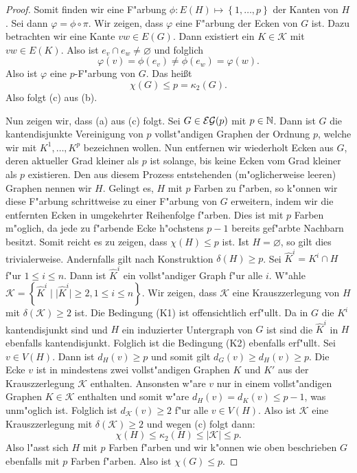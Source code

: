 \begin{proof}
  Somit finden wir eine F"arbung $\phi : E(H) \mapsto \left\{ 1,\dots,p \right\}$ der Kanten von $H$. Sei dann $\varphi =  \phi \circ \pi$. Wir zeigen, dass $\varphi$ eine F"arbung der Ecken von $G$ ist. Dazu betrachten wir eine Kante $vw\in E(G)$. Dann existiert ein $K\in \mathcal{K}$ mit $vw\in E(K)$. Also ist $e_v\cap e_w \neq \varnothing$ und folglich \begin{equation*}
    \varphi(v) = \phi(e_v) \neq \phi(e_w) = \varphi(w).
  \end{equation*} 
  Also ist $\varphi$ eine $p$-F"arbung von $G$. Das hei{\ss}t
  \begin{equation*}
    \chi(G) \leq p = \kappa_{2}(G).
  \end{equation*}
  Also folgt (c) aus (b).

  Nun zeigen wir, dass (a) aus (c) folgt. 
  Sei $G\in {\cal EG}(p) $ mit $p\in {\mathbb{N}}$. Dann ist $G$ die kantendisjunkte Vereinigung von $p$ vollst"andigen Graphen der Ordnung $p$, welche wir mit $K^{1},\dots, K^{p}$ bezeichnen wollen. Nun entfernen wir wiederholt Ecken aus $G$,  deren aktueller Grad kleiner als $p$ ist solange, bis keine Ecken vom Grad kleiner als $p$ existieren. Den aus diesem Prozess entstehenden (m"oglicherweise leeren) Graphen nennen wir $H$. 
  Gelingt es, $H$ mit $p$ Farben zu f"arben, so k"onnen wir diese F"arbung schrittweise zu einer F"arbung von $G$ erweitern, indem wir die entfernten Ecken in umgekehrter Reihenfolge f"arben. Dies ist mit $p$ Farben m"oglich, da jede zu f"arbende Ecke h"ochstens $p-1$ bereits gef"arbte Nachbarn besitzt.
  Somit reicht es zu zeigen, dass $\chi(H) \leq p$ ist. Ist $H =\varnothing$, so gilt dies trivialerweise. Andernfalls gilt nach Konstruktion $\delta(H) \geq p $. 
  Sei $\hat{K}^i = K^{i} \cap H$ f"ur $1\leq i \leq n$. Dann ist $\hat{K}^i$ ein vollst"andiger Graph f"ur alle $i$. W"ahle $\mathcal{K} = \left\{ \hat{K}^i \;|\; | \hat{K}^i| \geq 2  , 1\leq i \leq n\right\}$. Wir zeigen, dass $\mathcal{K}$ eine Krauszzerlegung von $H$ mit $\delta(\mathcal{K}) \geq 2$ ist.
  Die Bedingung (K1) ist offensichtlich erf"ullt. Da in $G$ die $K^{i}$ kantendisjunkt sind und $H$ ein induzierter Untergraph von $G$ ist sind die $\hat{K}^{i}$ in $H$ ebenfalls kantendisjunkt. Folglich ist die Bedingung (K2) ebenfalls erf"ullt. Sei $v\in V(H)$. Dann ist $d_{H}(v) \geq p$ und somit gilt $d_{G}(v) \geq d_H(v) \geq p$. 
  Die Ecke $v$ ist in mindestens zwei vollst"andigen Graphen $K$ und $K'$ aus der Krauszzerlegung $\mathcal{K}$ enthalten. 
  Ansonsten w"are $v$ nur in einem vollst"andigen Graphen $K \in \mathcal{K}$ enthalten und somit w"are $d_{H}(v) = d_{K}(v) \leq p-1$, was unm"oglich ist. 
  Folglich ist $d_{\mathcal{K}}(v) \geq 2$ f"ur alle $v \in V(H)$. Also ist $\mathcal{K}$ eine Krauszzerlegung mit $\delta(\mathcal{K}) \geq 2$ und wegen (c) folgt dann:
  \begin{equation*}
    \chi(H) \leq \kappa_{2}(H) \leq |\mathcal{K}| \leq p .
  \end{equation*}
  Also l"asst sich $H$ mit $p$ Farben f"arben und wir k"onnen wie oben beschrieben $G$ ebenfalls mit $p$ Farben f"arben. Also ist $\chi(G) \leq p$.
\end{proof}

